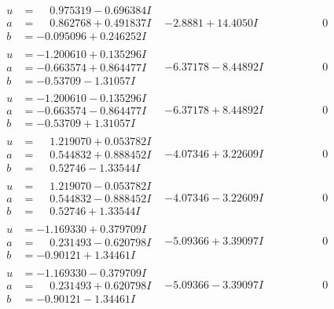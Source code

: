 \documentclass[1p]{elsarticle_modified}
\theoremstyle{definition}
\begin{document}
$$\begin{array}{c|c|c}
\begin{aligned}
u &= \phantom{-}0.975319 - 0.696384 I \\
a &= \phantom{-}0.862768 + 0.491837 I \\
b &= -0.095096 + 0.246252 I\end{aligned}
 & -2.8881 + 14.4050 I & \phantom{-0.000000 } 0 \\ \hline\begin{aligned}
u &= -1.200610 + 0.135296 I \\
a &= -0.663574 + 0.864477 I \\
b &= -0.53709 - 1.31057 I\end{aligned}
 & -6.37178 - 8.44892 I & \phantom{-0.000000 } 0 \\ \hline\begin{aligned}
u &= -1.200610 - 0.135296 I \\
a &= -0.663574 - 0.864477 I \\
b &= -0.53709 + 1.31057 I\end{aligned}
 & -6.37178 + 8.44892 I & \phantom{-0.000000 } 0 \\ \hline\begin{aligned}
u &= \phantom{-}1.219070 + 0.053782 I \\
a &= \phantom{-}0.544832 + 0.888452 I \\
b &= \phantom{-}0.52746 - 1.33544 I\end{aligned}
 & -4.07346 + 3.22609 I & \phantom{-0.000000 } 0 \\ \hline\begin{aligned}
u &= \phantom{-}1.219070 - 0.053782 I \\
a &= \phantom{-}0.544832 - 0.888452 I \\
b &= \phantom{-}0.52746 + 1.33544 I\end{aligned}
 & -4.07346 - 3.22609 I & \phantom{-0.000000 } 0 \\ \hline\begin{aligned}
u &= -1.169330 + 0.379709 I \\
a &= \phantom{-}0.231493 - 0.620798 I \\
b &= -0.90121 + 1.34461 I\end{aligned}
 & -5.09366 + 3.39097 I & \phantom{-0.000000 } 0 \\ \hline\begin{aligned}
u &= -1.169330 - 0.379709 I \\
a &= \phantom{-}0.231493 + 0.620798 I \\
b &= -0.90121 - 1.34461 I\end{aligned}
 & -5.09366 - 3.39097 I & \phantom{-0.000000 } 0 \\ \hline\begin{aligned}

\end{aligned}
\end{array}$$
\end{document}

